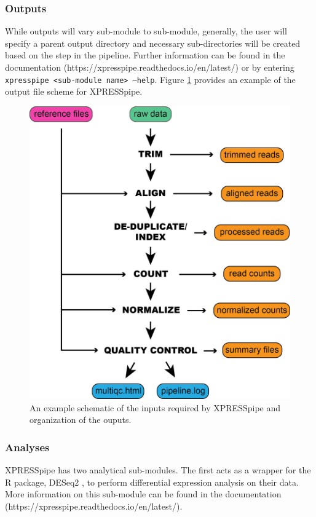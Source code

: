 \documentclass[11pt, a4paper, oneside]{article}
\begin{document}
\subsubsection{Outputs}
While outputs will vary sub-module to sub-module, generally, the user will specify a parent output directory and necessary sub-directories will be created based on the step in the pipeline. Further information can be found in the documentation (https://xpresspipe.readthedocs.io/en/latest/) or by entering \texttt{xpresspipe \textless sub-module name\textgreater \ --help}. Figure \ref{fig:outputs} provides an example of the output file scheme for XPRESSpipe.

\begin{figure}
\centering
  \includegraphics[width=120mm]{figures/xpresspipe_overview.png}
  \caption{An example schematic of the inputs required by XPRESSpipe and organization of the ouputs.}
  \label{fig:outputs}
\end{figure}


\subsubsection{Analyses}
XPRESSpipe has two analytical sub-modules. The first acts as a wrapper for the R package, DESeq2 \cite{deseq2}, to perform differential expression analysis on their data. More information on this sub-module can be found in the documentation (https://xpresspipe.readthedocs.io/en/latest/).
\end{document}
